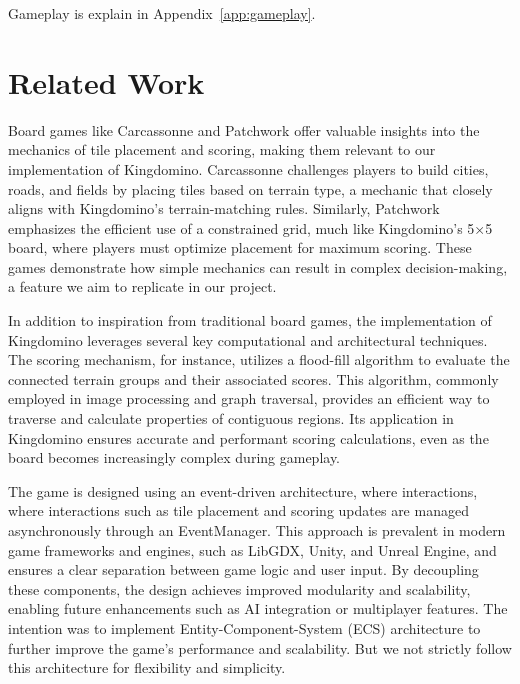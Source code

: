 \documentclass[conference]{IEEEtran}
\begin{document}
Gameplay is explain in Appendix~\ref{app:gameplay}.

\section{Related Work}
Board games like Carcassonne\cite{wiki:carcassonne} and
Patchwork\cite{wiki:patchwork} offer valuable insights into the mechanics of
tile placement and scoring, making them relevant to our implementation of
Kingdomino. Carcassonne challenges players to build cities, roads, and fields
by placing tiles based on terrain type, a mechanic that closely aligns with
Kingdomino’s terrain-matching rules. Similarly, Patchwork emphasizes the
efficient use of a constrained grid, much like Kingdomino’s 5×5 board, where
players must optimize placement for maximum scoring. These games demonstrate
how simple mechanics can result in complex decision-making, a feature we aim to
replicate in our project.

In addition to inspiration from traditional board games, the implementation of
Kingdomino leverages several key computational and architectural techniques.
The scoring mechanism, for instance, utilizes a flood-fill
algorithm\cite{wiki:floodfill} to evaluate the connected terrain groups and
their associated scores. This algorithm, commonly employed in image processing
and graph traversal\cite{wiki:graphtraversal}, provides an efficient way to
traverse and calculate properties of contiguous regions. Its application in
Kingdomino ensures accurate and performant scoring calculations, even as the
board becomes increasingly complex during gameplay.

The game is designed using an event-driven architecture\cite{wiki:eventdriven,
    wiki:floodfill}, where interactions, where interactions such as tile placement
and scoring updates are managed asynchronously through an EventManager. This
approach is prevalent in modern game frameworks and engines, such as LibGDX,
Unity, and Unreal Engine, and ensures a clear separation between game logic and
user input. By decoupling these components, the design achieves improved
modularity and scalability, enabling future enhancements such as AI integration
or multiplayer features. The intention was to implement Entity-Component-System
(ECS) architecture\cite{wiki:ecs} to further improve the game's performance and
scalability. But we not strictly follow this architecture for flexibility and
simplicity.
\end{document}
